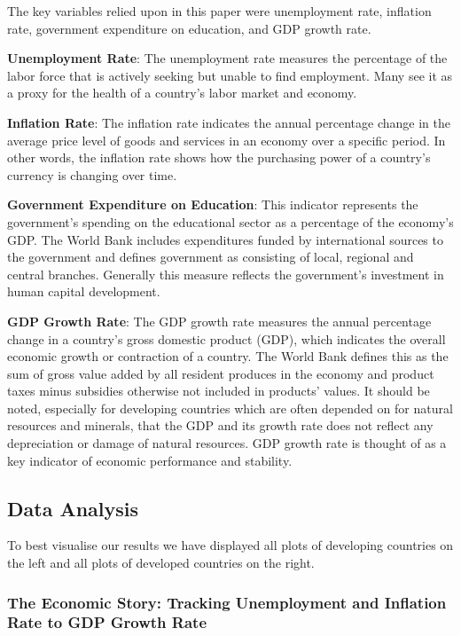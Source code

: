 \documentclass[
  letterpaper,
  DIV=11,
  numbers=noendperiod]{scrartcl}
\begin{document}
The key variables relied upon in this paper were unemployment rate,
inflation rate, government expenditure on education, and GDP growth
rate.

\textbf{Unemployment Rate}: The unemployment rate measures the
percentage of the labor force that is actively seeking but unable to
find employment. Many see it as a proxy for the health of a country's
labor market and economy.

\textbf{Inflation Rate}: The inflation rate indicates the annual
percentage change in the average price level of goods and services in an
economy over a specific period. In other words, the inflation rate shows
how the purchasing power of a country's currency is changing over time.

\textbf{Government Expenditure on Education}: This indicator represents
the government's spending on the educational sector as a percentage of
the economy's GDP. The World Bank includes expenditures funded by
international sources to the government and defines government as
consisting of local, regional and central branches. Generally this
measure reflects the government's investment in human capital
development.

\textbf{GDP Growth Rate}: The GDP growth rate measures the annual
percentage change in a country's gross domestic product (GDP), which
indicates the overall economic growth or contraction of a country. The
World Bank defines this as the sum of gross value added by all resident
produces in the economy and product taxes minus subsidies otherwise not
included in products' values. It should be noted, especially for
developing countries which are often depended on for natural resources
and minerals, that the GDP and its growth rate does not reflect any
depreciation or damage of natural resources. GDP growth rate is thought
of as a key indicator of economic performance and stability.

\subsection{Data Analysis}\label{data-analysis}

To best visualise our results we have displayed all plots of developing
countries on the left and all plots of developed countries on the right.

\subsubsection{The Economic Story: Tracking Unemployment and Inflation
Rate to GDP Growth
Rate}\label{the-economic-story-tracking-unemployment-and-inflation-rate-to-gdp-growth-rate}
\end{document}
